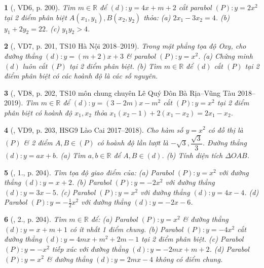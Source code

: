 \documentclass{article}
\newtheorem{baitoan}{}
\begin{document}
\begin{baitoan}[\cite{Thu_Viet_Minh_ptb2}, VD6, p. 200]
	Tìm $m\in\mathbb{R}$ để $(d):y = 4x + m + 2$ cắt parabol $(P):y = 2x^2$ tại 2 điểm phân biệt $A(x_1,y_1),B(x_2,y_2)$ thỏa: (a) $2x_1 - 3x_2 = 4$. (b) $y_1 + 2y_2 = 22$. (c) $y_1y_2 > 4$.
\end{baitoan}

\begin{baitoan}[\cite{Thu_Viet_Minh_ptb2}, VD7, p. 201, TS10 Hà Nội 2018--2019]
	Trong mặt phẳng tọa độ Oxy, cho đường thẳng $(d):y = (m + 2)x + 3$ \& parabol $(P):y = x^2$. (a) Chứng minh $(d)$ luôn cắt $(P)$ tại 2 điểm phân biệt. (b) Tìm $m\in\mathbb{R}$ để $(d)$ cắt $(P)$ tại 2 điểm phân biệt có các hoành độ là các số nguyên.
\end{baitoan}

\begin{baitoan}[\cite{Thu_Viet_Minh_ptb2}, VD8, p. 202, TS10 môn chung chuyên Lê Quý Đôn Bà Rịa--Vũng Tàu 2018--2019]
	Tìm $m\in\mathbb{R}$ để $(d):y = (3 - 2m)x - m^2$ cắt $(P):y = x^2$ tại 2 điểm phân biệt có hoành độ $x_1,x_2$ thỏa $x_1(x_2 - 1) + 2(x_1 - x_2) = 2x_1 - x_2$.
\end{baitoan}

\begin{baitoan}[\cite{Thu_Viet_Minh_ptb2}, VD9, p. 203, HSG9 Lào Cai 2017--2018]
	Cho hàm số $y = x^2$ có đồ thị là $(P)$ \& 2 điểm $A,B\in(P)$ có hoành độ lần lượt là $-\sqrt{3},\dfrac{\sqrt{3}}{3}$. Đường thẳng $(d):y = ax + b$. (a) Tìm $a,b\in\mathbb{R}$ để $A,B\in(d)$. (b) Tính diện tích $\Delta OAB$.
\end{baitoan}

\begin{baitoan}[\cite{Thu_Viet_Minh_ptb2}, 1., p. 204]
	Tìm tọa độ giao điểm của: (a) Parabol $(P):y = x^2$ với đường thẳng $(d):y = x + 2$. (b) Parabol $(P):y = -2x^2$ với đường thẳng $(d):y = 3x - 5$. (c) Parabol $(P):y = x^2$ với đường thẳng $(d):y = 4x - 4$. (d) Parabol $(P):y = -\frac{1}{2}x^2$ với đường thẳng $(d):y = -2x - 6$.
\end{baitoan}

\begin{baitoan}[\cite{Thu_Viet_Minh_ptb2}, 2., p. 204]
	Tìm $m\in\mathbb{R}$ để: (a) Parabol $(P):y = x^2$ \& đường thẳng $(d):y = x + m + 1$ có ít nhất 1 điểm chung. (b) Parabol $(P):y = -4x^2$ cắt đường thẳng $(d):y = 4mx + m^2 + 2m - 1$ tại 2 điểm phân biệt. (c) Parabol $(P):y = -x^2$ tiếp xúc với đường thẳng $(d):y = -2mx + m + 2$. (d) Parabol $(P):y = x^2$ \& đường thẳng $(d):y = 2mx - 4$ không có điểm chung.
\end{baitoan}
\end{document}
